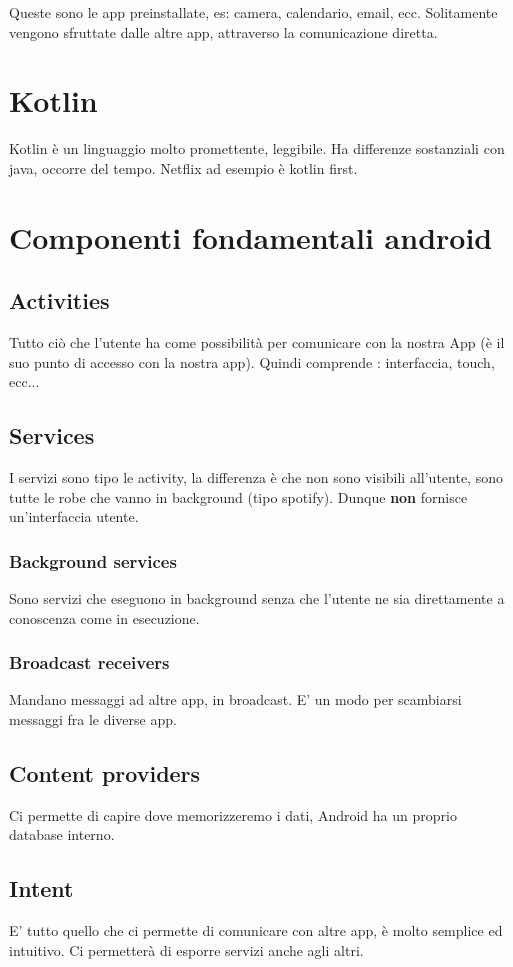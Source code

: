 Queste sono le app preinstallate, es: camera, calendario, email, ecc. Solitamente vengono sfruttate dalle altre app, attraverso la comunicazione diretta.

\section{Kotlin}

Kotlin è un linguaggio molto promettente, leggibile. Ha differenze sostanziali con java, occorre del tempo. Netflix ad esempio è kotlin first.

\section{Componenti fondamentali android}

\subsection{Activities}

Tutto ciò che l'utente ha come possibilità per comunicare con la nostra App (è il suo punto di accesso con la nostra app). Quindi comprende : interfaccia, touch, ecc...

\subsection{Services}

I servizi sono tipo le activity, la differenza è che non sono visibili all'utente, sono tutte le robe che vanno in background (tipo spotify). Dunque \textbf{non} fornisce un'interfaccia utente.

\subsubsection{Background services}

Sono servizi che eseguono in background senza che l'utente ne sia direttamente a conoscenza come in esecuzione.

\subsubsection{Broadcast receivers}

Mandano messaggi ad altre app, in broadcast. E' un modo per scambiarsi messaggi fra le diverse app.

\subsection{Content providers}

Ci permette di capire dove memorizzeremo i dati, Android ha un proprio database interno.

\subsection{Intent}

E' tutto quello che ci permette di comunicare con altre app, è molto semplice ed intuitivo. Ci permetterà di esporre servizi anche agli altri.